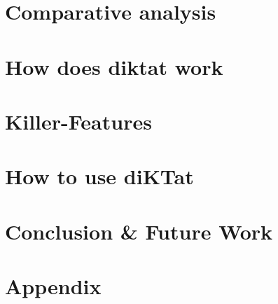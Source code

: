 \documentclass[acmlarge, screen, nonacm]{acmart}
\begin{document}
\begin{CJK*}{UTF8}{gbsn}
\section{Comparative analysis}
\label{sec:compare}


\section{How does diktat work}
\label{sec:work}


\section{Killer-Features}
\label{sec:feature}


\section{How to use diKTat}
\label{sec:download}


\section{Conclusion \& Future Work}
\label{sec:conclusion}


\newpage
\nocite{*}



\newpage
\section{Appendix}
\label{sec:appendix}


\end{CJK*}
\end{document}
